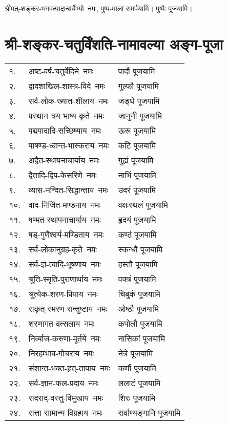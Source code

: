 \begin{center}
श्रीमत्-शङ्कर-भगवत्पादाचार्येभ्यो~नमः, पुष्प-मालां समर्पयामि। पुष्पैः पूजयामि।\\
\endgroup

\section{श्री-शङ्कर-चतुर्विंशति-नामावल्या अङ्ग-पूजा}
\begin{tabular}{lll}
१. & अष्ट-वर्ष-चतुर्वेदिने~नमः &  पादौ पूजयामि\\
२. & द्वादशाखिल-शास्त्र-विदे~नमः &  गुल्फौ पूजयामि\\
३. & सर्व-लोक-ख्यात-शीलाय~नमः &  जङ्घे पूजयामि\\
४. & प्रस्थान-त्रय-भाष्य-कृते~नमः &  जानुनी पूजयामि\\
५. & पद्मपादादि-सच्छिष्याय~नमः &  ऊरू पूजयामि\\
६. & पाषण्ड-ध्वान्त-भास्कराय~नमः &  कटिं पूजयामि\\
७. & अद्वैत-स्थापनाचार्याय~नमः &  गुह्यं पूजयामि\\
८. & द्वैतादि-द्विप-केसरिणे~नमः &  नाभिं पूजयामि\\
९. & व्यास-नन्दित-सिद्धान्ताय~नमः &  उदरं पूजयामि\\
१०. & वाद-निर्जित-मण्डनाय~नमः &  वक्षःस्थलं पूजयामि\\
११. & षण्मत-स्थापनाचार्याय~नमः &  हृदयं पूजयामि\\
१२. & षड्-गुणैश्वर्य-मण्डिताय~नमः &  कण्ठं पूजयामि\\
१३. & सर्व-लोकानुग्रह-कृते~नमः &  स्कन्धौ पूजयामि\\
१४. & सर्व-ज्ञ-त्वादि-भूषणाय~नमः &  हस्तौ पूजयामि\\
१५. & श्रुति-स्मृति-पुराणार्थाय~नमः &  वक्त्रं पूजयामि\\
१६. & श्रुत्येक-शरण-प्रियाय~नमः &  चिबुकं पूजयामि\\
१७. & सकृत्-स्मरण-सन्तुष्टाय~नमः &  ओष्ठौ पूजयामि\\
१८. & शरणागत-वत्सलाय~नमः &  कपोलौ पूजयामि\\
१९. & निर्व्याज-करुणा-मूर्तये~नमः &  नासिकां पूजयामि\\
२०. & निरहम्भाव-गोचराय~नमः &  नेत्रे पूजयामि\\
२१. & संशान्त-भक्त-हृत्-तापाय~नमः &  कर्णौ पूजयामि\\
२२. & सर्व-ज्ञान-फल-प्रदाय~नमः &  ललाटं पूजयामि\\
२३. & सदसद्-वस्तु-विमुखाय~नमः &  शिरः पूजयामि\\
२४. & सत्ता-सामान्य-विग्रहाय~नमः& सर्वाण्यङ्गानि पूजयामि\\
\end{tabular}



\end{center}
